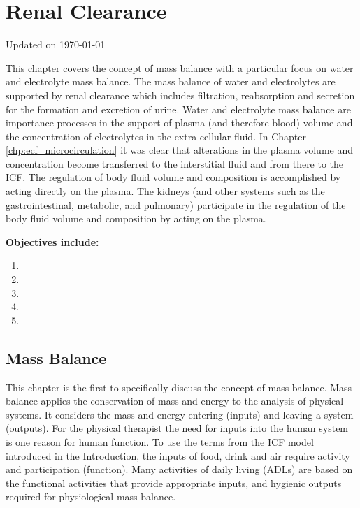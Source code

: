 \chapter{Renal Clearance}\label{chp:blood_content}
Updated on \today
\minitoc

This chapter covers the concept of mass balance with a particular focus on water and electrolyte mass balance. The mass balance of water and electrolytes are supported by renal clearance which includes filtration, reabsorption and secretion for the formation and excretion of urine. Water and electrolyte mass balance are importance processes in the support of plasma (and therefore blood) volume and the concentration of electrolytes in the extra-cellular fluid. In Chapter \ref{chp:ecf_microcirculation} it was clear that alterations in the plasma volume and concentration become transferred to the interstitial fluid and from there to the ICF. The regulation of body fluid volume and composition is accomplished by acting directly on the plasma. The kidneys (and other systems such as the gastrointestinal, metabolic, and pulmonary) participate in the regulation of the body fluid volume and composition by acting on the plasma.

\vspace{5mm}

\textbf{Objectives include:}
\begin{enumerate}
    \item
    \item
    \item
    \item
    \item
\end{enumerate}

\section{Mass Balance}

This chapter is the first to specifically discuss the concept of mass balance. Mass balance applies the conservation of mass and energy to the analysis of physical systems. It considers the mass and energy entering (inputs) and leaving a system (outputs). For the physical therapist the need for inputs into the human system is one reason for human function. To use the terms from the ICF model introduced in the Introduction, the inputs of food, drink and air require activity and participation (function). Many activities of daily living (ADLs) are based on the functional activities that provide appropriate inputs, and hygienic outputs required for physiological mass balance.


